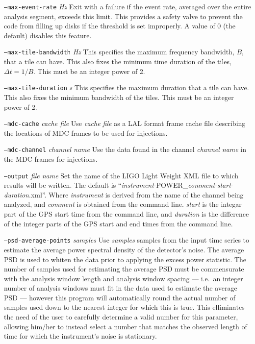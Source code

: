 \documentclass[10pt]{article}
\newcommand{\option}[1]{\texttt{#1}}
\newcommand{\parm}[1]{\textit{#1}}
\newenvironment{entry}%
{\begin{list}{}{\renewcommand{\makelabel}[1]%
{\parbox[b]{\labelwidth}{\makebox[0pt][l]{\textbf{##1}}\\}}%
\setlength{\labelwidth}{1em}%
\setlength{\labelsep}{1em}%
\setlength{\leftmargin}{2em}%
\setlength{\topsep}{\medskipamount}%
\setlength{\itemsep}{\medskipamount}%
\setlength{\parsep}{\medskipamount}%
\setlength{\listparindent}{0pt}}}
{\end{list}}
\begin{document}
\begin{entry}
\begin{entry}
\item[\option{--max-event-rate} \parm{Hz}]
Exit with a failure if the event rate, averaged over the entire analysis
segment, exceeds this limit.  This provides a safety valve to prevent the
code from filling up disks if the threshold is set improperly.  A value of
0 (the default) disables this feature.

\item[\option{--max-tile-bandwidth} \parm{Hz}]
This specifies the maximum frequency bandwidth, \(B\), that a tile can
have.  This also fixes the minimum time duration of the tiles, \(\Delta t =
1/B\).  This must be an integer power of 2.

\item[\option{--max-tile-duration} \parm{s}]
This specifies the maximum duration that a tile can have.  This also fixes
the minimum bandwidth of the tiles.  This must be an integer power of 2.

\item[\option{--mdc-cache} \parm{cache file}]
Use \parm{cache file} as a LAL format frame cache file describing the
locations of MDC frames to be used for injections.

\item[\option{--mdc-channel} \parm{channel name}]
Use the data found in the channel \parm{channel name} in the MDC frames for
injections.

\item[\option{--output} \parm{file name}]
Set the name of the LIGO Light Weight XML file to which results will be
written.  The default is
``\parm{instrument}-POWER\_\parm{comment}-\parm{start}-\parm{duration}.xml''.
Where \parm{instrument} is derived from the name of the channel being
analyzed, and \parm{comment} is obtained from the command line.
\parm{start} is the integar part of the GPS start time from the command
line, and \parm{duration} is the difference of the integer parts of the
GPS start and end times from the command line.

\item[\option{--psd-average-points} \parm{samples}]
Use \parm{samples} samples from the input time series to estimate the
average power spectral density of the detector's noise.  The average PSD is
used to whiten the data prior to applying the excess power statistic.  The
number of samples used for estimating the average PSD must be commensurate
with the analysis window length and analysis window spacing --- i.e.\ an
integer number of analysis windows must fit in the data used to estimate
the average PSD --- however this program will automatically round the
actual number of samples used down to the nearest integer for which this is
true.  This elliminates the need of the user to carefully determine a valid
number for this parameter, allowing him/her to instead select a number that
matches the observed length of time for which the instrument's noise is
stationary.


\end{entry}
\end{entry}
\end{document}
